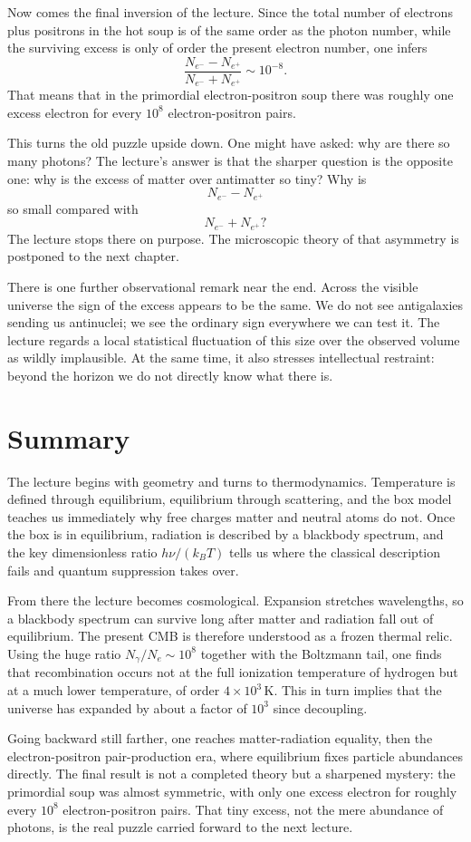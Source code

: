 Now comes the final inversion of the lecture. Since the total number of electrons plus positrons in the hot soup is of the same order as the photon number, while the surviving excess is only of order the present electron number, one infers
\begin{equation}
\frac{N_{e^-}-N_{e^+}}{N_{e^-}+N_{e^+}} \sim 10^{-8}.
\end{equation}
That means that in the primordial electron-positron soup there was roughly one excess electron for every \(10^8\) electron-positron pairs.

This turns the old puzzle upside down. One might have asked: why are there so many photons? The lecture's answer is that the sharper question is the opposite one: why is the excess of matter over antimatter so tiny? Why is
\[
N_{e^-}-N_{e^+}
\]
so small compared with
\[
N_{e^-}+N_{e^+}?
\]
The lecture stops there on purpose. The microscopic theory of that asymmetry is postponed to the next chapter.

There is one further observational remark near the end. Across the visible universe the sign of the excess appears to be the same. We do not see antigalaxies sending us antinuclei; we see the ordinary sign everywhere we can test it. The lecture regards a local statistical fluctuation of this size over the observed volume as wildly implausible. At the same time, it also stresses intellectual restraint: beyond the horizon we do not directly know what there is.

\section{Summary}

The lecture begins with geometry and turns to thermodynamics. Temperature is defined through equilibrium, equilibrium through scattering, and the box model teaches us immediately why free charges matter and neutral atoms do not. Once the box is in equilibrium, radiation is described by a blackbody spectrum, and the key dimensionless ratio \(h\nu/(k_B T)\) tells us where the classical description fails and quantum suppression takes over.

From there the lecture becomes cosmological. Expansion stretches wavelengths, so a blackbody spectrum can survive long after matter and radiation fall out of equilibrium. The present CMB is therefore understood as a frozen thermal relic. Using the huge ratio \(N_\gamma/N_e \sim 10^8\) together with the Boltzmann tail, one finds that recombination occurs not at the full ionization temperature of hydrogen but at a much lower temperature, of order \(4\times 10^3\,\mathrm{K}\). This in turn implies that the universe has expanded by about a factor of \(10^3\) since decoupling.

Going backward still farther, one reaches matter-radiation equality, then the electron-positron pair-production era, where equilibrium fixes particle abundances directly. The final result is not a completed theory but a sharpened mystery: the primordial soup was almost symmetric, with only one excess electron for roughly every \(10^8\) electron-positron pairs. That tiny excess, not the mere abundance of photons, is the real puzzle carried forward to the next lecture.